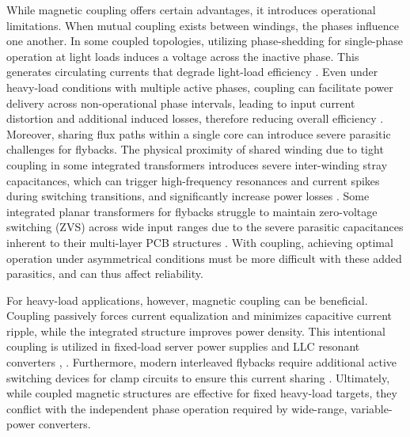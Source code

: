 \documentclass[lettersize,journal]{IEEEtran}
\begin{document}
While magnetic coupling offers certain advantages, it introduces operational limitations. When mutual coupling exists between windings, the phases influence one another. In some coupled  topologies, utilizing phase-shedding for single-phase operation at light loads induces a voltage across the inactive phase. This generates circulating currents that degrade light-load efficiency \cite{Yang_2020, Z_Li_2025}. Even under heavy-load conditions with multiple active phases, coupling can facilitate power delivery across non-operational phase intervals, leading to input current distortion and additional induced losses, therefore reducing overall efficiency \cite{Yang_2020}. Moreover, sharing flux paths within a single core can introduce severe parasitic challenges for flybacks. The physical proximity of shared winding due to tight coupling in some integrated transformers introduces severe inter-winding stray capacitances, which can trigger high-frequency resonances and current spikes during switching transitions, and significantly increase power losses \cite{meng2021}. Some integrated planar transformers for flybacks struggle to maintain zero-voltage switching (ZVS) across wide input ranges due to the severe parasitic capacitances inherent to their multi-layer PCB structures \cite{kwon2024}. With coupling, achieving optimal operation under asymmetrical conditions must be more difficult with these added parasitics, and can thus affect reliability.

For heavy-load applications, however, magnetic coupling can be beneficial. Coupling passively forces current equalization and minimizes capacitive current ripple, while the integrated structure improves power density. This intentional coupling is utilized in fixed-load server power supplies and LLC resonant converters \cite{Ahmad}, \cite{Dou, Nakakohara}. Furthermore, modern interleaved flybacks require additional active switching devices for clamp circuits to ensure this current sharing \cite{Z_Chen_s42835}. Ultimately, while coupled magnetic structures are effective for fixed heavy-load targets, they conflict with the independent phase operation required by wide-range, variable-power converters.
\end{document}
